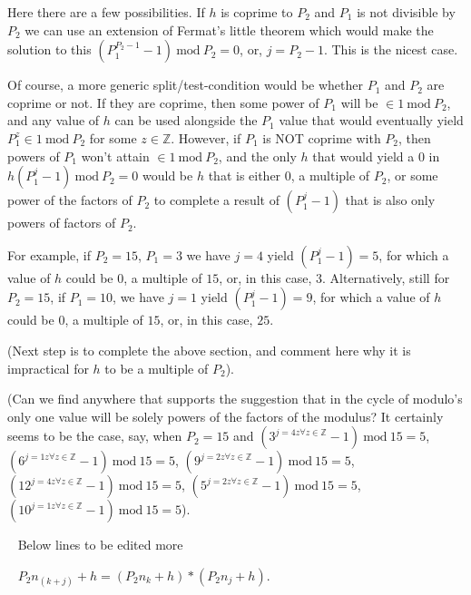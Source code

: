 \documentclass[12pt,a4paper]{amsart}
\numberwithin{equation}{section}
\theoremstyle{plain}
\theoremstyle{definition}
\begin{document}
Here there are a few possibilities. If $h$ is coprime to $P_2$ and $P_1$ is not divisible by $P_2$ we can use an extension of Fermat's little theorem which would make the solution to this $\left (  P^{P_2 - 1}_{1} - 1 \right )\:\mathrm{mod}\:P_{2} = 0$, or, $j = P_2 - 1$. This is the nicest case. 

Of course, a more generic split/test-condition would be whether $P_1$ and $P_2$ are coprime or not. If they are coprime, then some power of $P_1$ will be $\in1\:\mathrm{mod}\:P_{2}$, and any value of $h$ can be used alongside the $P_1$ value that would eventually yield $P^{z}_1\in1\:\mathrm{mod}\:P_{2}$ for some $z\in\mathbb{Z}$. However, if $P_1$ is NOT coprime with $P_2$, then powers of $P_1$ won't attain $\in1\:\mathrm{mod}\:P_{2}$, and the only $h$ that would yield a $0$ in  $h \left ( P^{j}_{1} - 1 \right )\:\mathrm{mod}\:P_{2} = 0$ would be $h$ that is either $0$, a multiple of $P_2$, or some power of the factors of $P_2$ to complete a result of $\left ( P^{j}_{1} - 1 \right )$ that is also only powers of factors of $P_2$.

For example, if $P_2 = 15$, $P_1 = 3$ we have $j=4$ yield $\left ( P^{j}_{1} - 1 \right ) = 5$, for which a value of $h$ could be $0$, a multiple of $15$, or, in this case, $3$. Alternatively, still for $P_2 = 15$, if $P_1 = 10$, we have $j=1$ yield $\left ( P^{j}_{1} - 1 \right ) = 9$, for which a value of $h$ could be $0$, a multiple of $15$, or, in this case, $25$. 

(Next step is to complete the above section, and comment here why it is impractical for $h$ to be a multiple of $P_2$).

(Can we find anywhere that supports the suggestion that in the cycle of modulo's only one value will be solely powers of the factors of the modulus? It certainly seems to be the case, say, when $P_2 = 15$ and $\left (3^{j=4z\forall z \in \mathbb{Z}}-1 \right ) \:\mathrm{mod}\:15 = 5$, $\left (6^{j=1z\forall z \in \mathbb{Z}}-1 \right ) \:\mathrm{mod}\:15 = 5$,  $\left (9^{j=2z\forall z \in \mathbb{Z}}-1 \right ) \:\mathrm{mod}\:15 = 5$, $\left (12^{j=4z\forall z \in \mathbb{Z}}-1 \right ) \:\mathrm{mod}\:15 = 5$, $\left (5^{j=2z\forall z \in \mathbb{Z}}-1 \right ) \:\mathrm{mod}\:15 = 5$, $\left (10^{j=1z\forall z \in \mathbb{Z}}-1 \right ) \:\mathrm{mod}\:15 = 5$).

~ Below lines to be edited more ~

~ $P_{2}n_{\left ( k+j \right )} + h = \left ( P_{2}n_{k} + h \right )*\left ( P_{2}n_{j} + h \right )$.
\end{document}

